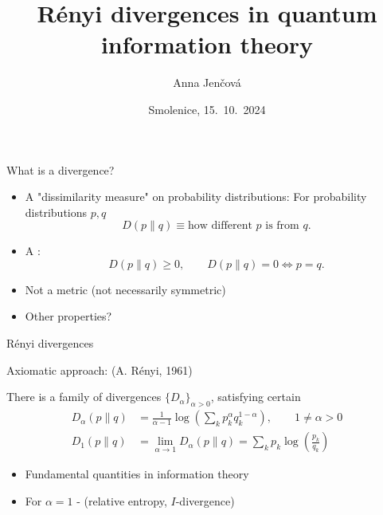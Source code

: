 \documentclass[mathserif]{beamer}
\title{R\'enyi divergences in quantum information theory}
\author{Anna Jen\v cov\'a}
\institute{Mathematical Institute, Slovak Academy
of Sciences}
\date{Smolenice, 15.~10.~2024}
\newcommand{\<}{\langle}
\renewcommand{\>}{\rangle}
\begin{document}
\begin{frame}
  \titlepage
\end{frame}

\begin{frame}{What is a divergence?}

\begin{itemize}
\item A "dissimilarity measure" on probability distributions:
\vskip 2mm
For probability distributions $p,q$
\[
D(p\|q) \equiv \text{how different }p\text{ is from }q.
\]

\item  A :  
\[
D(p\|q)\ge 0,\qquad D(p\|q)=0 \iff p=q.
\]
\vskip 2mm
\item Not a metric (not necessarily symmetric)

\medskip
\item Other properties?
\end{itemize}


\end{frame}


\begin{frame}{R\'enyi divergences}

Axiomatic approach: {\small (A. R\'enyi, 1961)}

\medskip

There is a  family of divergences $\{D_\alpha\}_{\alpha>0}$,
satisfying certain 
\begin{align*}
D_\alpha(p\|q)&=\frac1{\alpha-1}\log\left(\sum_k p_k^\alpha q_k^{1-\alpha}\right), \qquad 1\ne
\alpha>0\\
D_1(p\|q)&=\lim_{\alpha\to 1} D_\alpha(p\|q)=\sum_k p_k\log\left(\frac{p_k}{q_k}\right)
\end{align*}

\medskip


\begin{itemize}

\item Fundamental quantities in information theory

\item For $\alpha=1$ -  (relative entropy,
$I$-divergence)

\end{itemize}

\end{frame}
\end{document}
